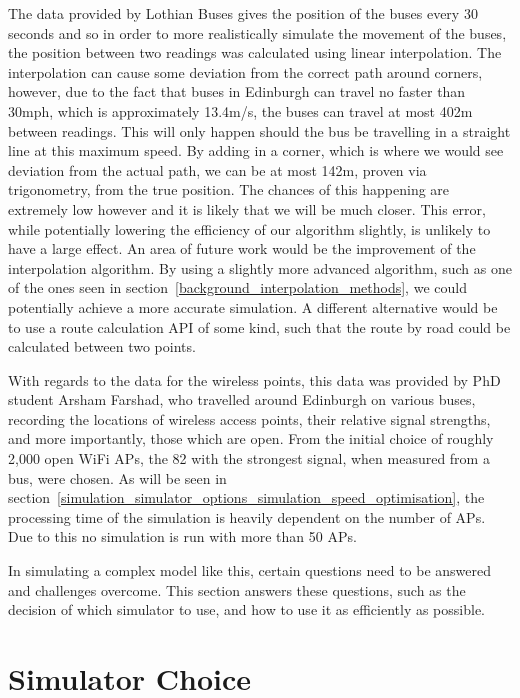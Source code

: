    The data provided by Lothian Buses gives the position of the buses every 30 seconds and so in order to more realistically simulate the movement of the buses, the position between two readings was calculated using linear interpolation. The interpolation can cause some deviation from the correct path around corners, however, due to the fact that buses in Edinburgh can travel no faster than 30mph, which is approximately 13.4m/s, the buses can travel at most 402m between readings. This will only happen should the bus be travelling in a straight line at this maximum speed. By adding in a corner, which is where we would see deviation from the actual path, we can be at most 142m, proven via trigonometry, from the true position. The chances of this happening are extremely low however and it is likely that we will be much closer. This error, while potentially lowering the efficiency of our algorithm slightly, is unlikely to have a large effect. An area of future work would be the improvement of the interpolation algorithm. By using a slightly more advanced algorithm, such as one of the ones seen in section~\ref{background_interpolation_methods}, we could potentially achieve a more accurate simulation. A different alternative would be to use a route calculation API of some kind, such that the route by road could be calculated between two points. 

    With regards to the data for the wireless points, this data was provided by PhD student Arsham Farshad, who travelled around Edinburgh on various buses, recording the locations of wireless access points, their relative signal strengths, and more importantly, those which are open. From the initial choice of roughly 2,000 open WiFi APs, the 82 with the strongest signal, when measured from a bus, were chosen. As will be seen in section~\ref{simulation_simulator_options_simulation_speed_optimisation}, the processing time of the simulation is heavily dependent on the number of APs. Due to this no simulation is run with more than 50 APs. 


    In simulating a complex model like this, certain questions need to be answered and challenges overcome. This section answers these questions, such as the decision of which simulator to use, and how to use it as efficiently as possible. 

    \section{Simulator Choice}\label{simulation_simulator_options_simulator_choice}

